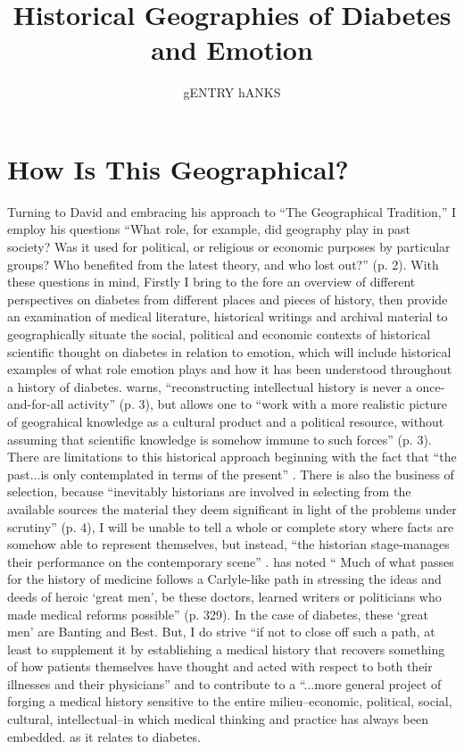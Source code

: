 \documentclass[12pt]{article}
\title{Historical Geographies of Diabetes and Emotion}
\author{gENTRY hANKS}
\begin{document}
\maketitle
\linenumbers


\newpage
\section{How Is This Geographical?}
\doublespacing
Turning to David \citet{livingstone_geographical_1993} and embracing his approach to ``The Geographical Tradition,'' I employ his questions ``What role, for example, did geography play in past society? Was it used for political, or religious or economic purposes by particular groups? Who benefited from the latest theory, and who lost out?'' (p. 2).  With these questions in mind, Firstly I bring to the fore an overview of different perspectives on diabetes from different places and pieces of history, then provide an examination of medical literature, historical writings and archival material to geographically situate the social, political and economic contexts of historical scientific thought on diabetes in relation to emotion, which will include historical examples of what role emotion plays and how it has been understood throughout a history of diabetes. \citet{livingstone_geographical_1993} warns, ``reconstructing intellectual history is never a once-and-for-all activity'' (p. 3), but allows one to ``work with a more realistic picture of geograhical knowledge as a cultural product and a political resource, without assuming that scientific knowledge is somehow immune to such forces'' (p. 3). There are limitations to this historical approach beginning with the fact that ``the past...is only contemplated in terms of the present'' \citep[p. 3]{livingstone_geographical_1993}. There is also the business of selection, because ``inevitably historians are involved in selecting from the available sources the material they deem significant in light of the problems under scrutiny'' (p. 4), I will be unable to tell a whole or complete story where facts are somehow able to represent themselves, but instead, ``the historian stage-manages their performance on the contemporary scene'' \citep[p. 5]{livingstone_geographical_1993}. \citet{philo_1987_Patients} has noted ``
Much of what passes for the history of medicine follows a Carlyle-like path in stressing the ideas and deeds of heroic `great men', be these doctors, learned writers or politicians who made medical reforms possible'' (p. 329). In the case of diabetes, these `great men' are Banting and Best. But, I do strive ``if not to close off such a path, at least to supplement it by establishing a medical history that recovers something of how patients themselves have thought and acted with respect to both their illnesses and their physicians'' and to contribute to a ``...more general project of forging a medical history sensitive to the entire milieu--economic, political, social, cultural, intellectual--in which medical thinking and practice has always been embedded.\citep[p. 329]{philo_1987_Patients} as it relates to diabetes. 
\end{document}
